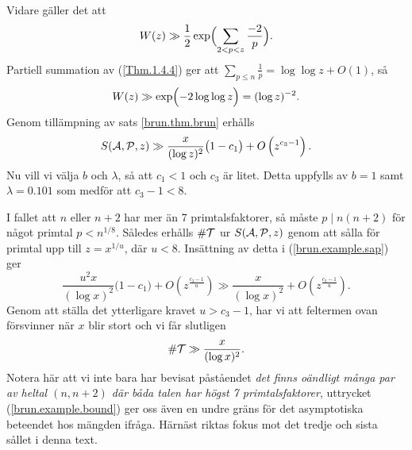 Vidare gäller det att 
\begin{align*}
    W(z) %
    \gg \frac{1}{2}\exp\Bigl(\sum_{2<p<z} \frac{-2}{p} \Bigr).
\end{align*}
Partiell summation av (\ref{Thm.1.4.4}) ger att $\sum_{p\leq n}\frac{1}{p} = \log\log z + O(1)$, så
\begin{align*}
    W(z) \gg \exp\Bigl(-2\log\log z\Bigr)
    = (\log z)^{-2}.
\end{align*}
Genom tillämpning av sats \ref{brun.thm.brun} erhålls
\begin{equation} \label{brun.example.sap}
    \S{A}{P}{z} \gg \frac{x}{(\log z)^2}\bigl(1 - c_1\bigr) + O\left(z^{c_3 - 1}\right).
\end{equation}
Nu vill vi välja $b$ och $\lambda$, så att $c_1<1$ och $c_3$ är litet. 
Detta uppfylls av $b=1$ samt $\lambda=0.101$ som medför att $c_3-1<8$.

I fallet att $n$ eller $n+2$ har mer än 7 primtalsfaktorer,
så måste $p\mid n(n+2)$ för något primtal $p < n^{1/8}$.
Således erhålls $\card\mathcal{T}$ ur $\S{A}{P}{z}$ genom att sålla för primtal upp till $z = x^{1/u}$, där $u<8$.
Insättning av detta i (\ref{brun.example.sap}) ger
\begin{equation*}
    \frac{u^2x}{(\log x)^2}\bigl(1 - c_1\bigr) + O\left(z^{\frac{c_3 - 1}{u}}\right) \gg 
    \frac{x}{(\log x)^2} + O\left(z^{\frac{c_3 - 1}{u}}\right).
\end{equation*}
Genom att ställa det ytterligare kravet $u>c_3-1$, har vi att feltermen ovan försvinner när $x$ blir stort och vi får slutligen
\begin{equation} \label{brun.example.bound}
    \card\mathcal{T} \gg \frac{x}{(\log x)^2}.
\end{equation}
Notera här att vi inte bara har bevisat påståendet \textit{det finns oändligt många par av heltal $(n,n+2)$ där båda talen har högst 7 primtalsfaktorer},
uttrycket (\ref{brun.example.bound}) ger oss även en undre gräns för det asymptotiska beteendet hos mängden ifråga.
Härnäst riktas fokus mot det tredje och sista sållet i denna text.




